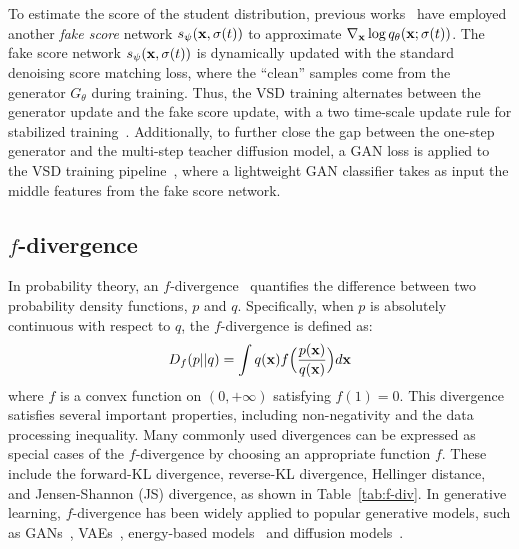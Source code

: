To estimate the score of the student distribution, previous works~\cite{Wang2023ProlificDreamerHA, yin2024one} have employed another \textit{fake score} network $s_\psi ({\mathbf{x}}, \sigma(t))$ to approximate  $\nabla_{\mathbf{x}} \log q_\theta({\mathbf{x}}; \sigma(t))$. The fake score network $s_\psi ({\mathbf{x}}, \sigma(t))$ is dynamically updated with the standard denoising score matching loss, where the ``clean'' samples come from the generator $G_\theta$ during training. 
Thus, the VSD training alternates between the generator update and the fake score update, with a two time-scale update rule for stabilized training~\citep{yin2024improved}.
Additionally, to further close the gap between the one-step generator and the multi-step teacher diffusion model, a GAN loss is applied to the VSD training pipeline~\citep{yin2024improved}, where a lightweight GAN classifier takes as input the middle features from the fake score network.



\subsection{$f$-divergence}

In probability theory, an $f$-divergence~\cite{Rnyi1961OnMO} quantifies the difference between two probability density functions, $p$ and $q$.  Specifically, when $p$ is absolutely continuous with respect to $q$, the $f$-divergence is defined as:
\begin{align*}
D_f(p||q) = \int q({\mathbf{x}}) f\Big(\frac{p({\mathbf{x}})}{q({\mathbf{x}})}\Big) d{\mathbf{x}}
\end{align*}
where $f$ is a convex function on $(0,+\infty)$ satisfying $f(1)=0$. This divergence satisfies several important properties, including non-negativity and the data processing inequality. Many commonly used divergences can be expressed as special cases of the $f$-divergence by choosing an appropriate function $f$. These include the forward-KL divergence, reverse-KL divergence, Hellinger distance, and Jensen-Shannon (JS) divergence, as shown in Table~\ref{tab:f-div}. In generative learning, $f$-divergence has been widely applied to popular generative models, such as GANs~\citep{nowozin2016f}, VAEs~\citep{wan2020fvi}, energy-based models~\citep{yu2020training} and diffusion models~\citep{tang2024fine}.

